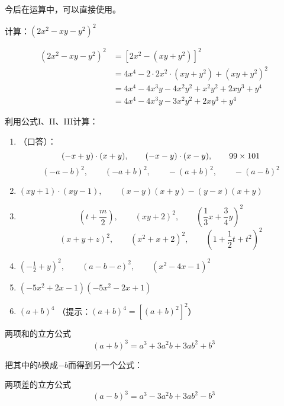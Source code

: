 今后在运算中，可以直接使用。

\begin{example}
    计算：$(2x^2-xy-y^2)^2$
\end{example}

\begin{solution}
    \[\begin{split}
(2x^2-xy-y^2)^2 &= [2x^2-(xy+y^2)]^2\\
&=4x^4-2\cdot 2x^2\cdot (xy+y^2)+  (xy+y^2)^2\\
&=     4x^4-4x^3y-4x^2y^2+x^2y^2+2xy^3+y^4\\ 
&=       4x^4-4x^3y-3x^2y^2+2xy^3+y^4
    \end{split}\]
\end{solution}

\begin{ex}
    利用公式I、II、III计算：
\begin{enumerate}
    \item （口答）：
    \[(-x+y)\cdot (x+y), \qquad (-x-y)\cdot (x-y),\qquad 99\times 101\]
    \[(-a-b)^2,\qquad (-a+b)^2,\qquad -(a+b)^2,\qquad -(a-b)^2 \]

    \item $(xy+1)\cdot (xy-1),\qquad (x-y)(x+y)-(y-x)(x+y)$
    \item \[\left(t+\frac{m}{2}\right),\qquad (xy+2)^2,\qquad \left(\frac{1}{3}x+\frac{3}{4}y\right)^2\]
     \[(x+y+z)^2,\qquad (x^2+x+2)^2,\qquad \left(1+\frac{1}{2}t+t^2\right)^2\]
\item $\left(-\frac{1}{2}+y\right)^2,\qquad (a-b-c)^2,\qquad (x^2-4x-1)^2$
\item $(-5x^2+2x-1)(-5x^2-2x+1)$
\item $(a+b)^4$  （提示：$(a+b)^4=[(a+b)^2]^2$）
    \end{enumerate}
\end{ex}

\begin{blk}{两项和的立方公式}
    \begin{equation*}
        (a+b)^3=a^3+3a^2b+3ab^2+b^3 \tag{IV}
    \end{equation*}
\end{blk}

把其中的$b$换成$-b$而得到另一个公式：

\begin{blk}{两项差的立方公式}
    \begin{equation*}
        (a-b)^3=a^3-3a^2b+3ab^2-b^3 \tag{V}  
    \end{equation*}
\end{blk}

